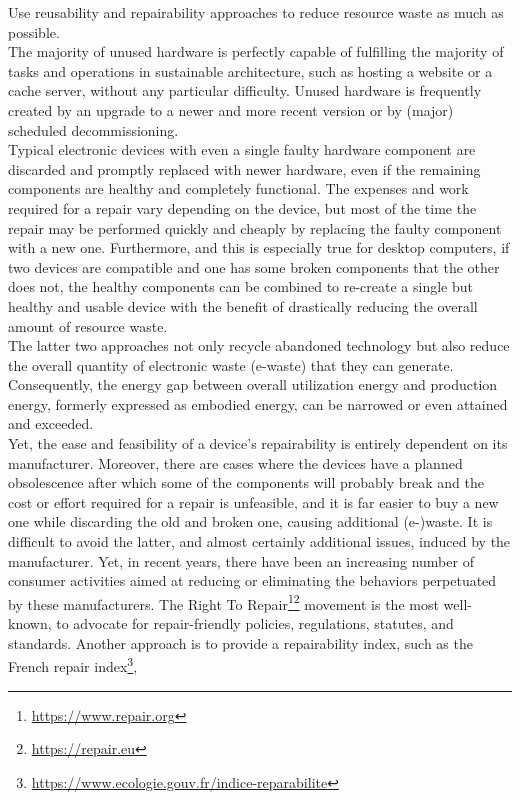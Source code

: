 Use reusability and repairability approaches to reduce resource waste as much as
possible. \\ %
The majority of unused hardware is perfectly capable of fulfilling the majority
of tasks and operations in sustainable architecture, such as hosting a website or
a cache server, without any particular difficulty. Unused hardware is frequently
created by an upgrade to a newer and more recent version or by (major) scheduled
decommissioning. \\ %
Typical electronic devices with even a single faulty hardware component are discarded
and promptly replaced with newer hardware, even if the remaining components are
healthy and completely functional. The expenses and work required for a repair vary
depending on the device, but most of the time the repair may be performed
quickly and cheaply by replacing the faulty component with a new one. Furthermore,
and this is especially true for desktop computers, if two devices are compatible
and one has some broken components that the other does not, the healthy
components can be combined to re-create a single but healthy and usable device
with the benefit of drastically reducing the overall amount of resource waste. \\ %
The latter two approaches not only recycle abandoned technology but also reduce
the overall quantity of electronic waste (e-waste) that they can generate. Consequently,
the energy gap between overall utilization energy and production energy, formerly
expressed as embodied energy, can be narrowed or even attained and exceeded. \\ %
Yet, the ease and feasibility of a device's repairability is entirely dependent on
its manufacturer. Moreover, there are cases where the devices have a planned obsolescence
after which some of the components will probably break and the cost or effort required
for a repair is unfeasible, and it is far easier to buy a new one while
discarding the old and broken one, causing additional (e-)waste. It is difficult
to avoid the latter, and almost certainly additional issues, induced by the
manufacturer. Yet, in recent years, there have been an increasing number of consumer
activities aimed at reducing or eliminating the behaviors perpetuated by these manufacturers.
The Right To Repair\footnote{\url{https://www.repair.org}}\footnote{\url{https://repair.eu}}
movement is the most well-known, to advocate for repair-friendly policies,
regulations, statutes, and standards. Another approach is to provide a repairability
index, such as the French repair index\footnote{\url{https://www.ecologie.gouv.fr/indice-reparabilite}},

